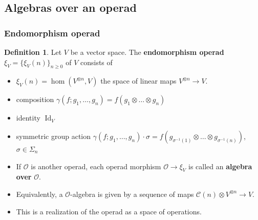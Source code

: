 \documentclass{beamer}
\theoremstyle{definition}
\newtheorem{defi}{Definition}
\newcommand{\CC}{\mathcal{C}}
\begin{document}
\subsection{Algebras over an operad}
\begin{frame}
	\frametitle{Endomorphism operad}
	\begin{defi}
		Let $V$ be a vector space. The \textbf{endomorphism operad} $\xi_V = \{ \xi_V(n) \}_{n\geq 0}$ of $V$ consists of
		\begin{itemize}
			\item<1-> $\xi_V(n)=\hom(V^{\otimes n},V)
			$ the space of linear maps $V^{\otimes n} \to V$.
			\item<2-> composition $\gamma(f; g_1, \dots, g_n)= f(g_1\otimes\dots\otimes g_n)$
			\item<3-> identity $\operatorname{Id}_V$
			\item<4->  symmetric group action $\gamma (f; g_1, \dots, g_n) \cdot \sigma = f (g_{\sigma^{-1}(1)} \otimes \dots \otimes g_{\sigma^{-1}(n)})$,  $\sigma \in \Sigma_n$
		\end{itemize}
	\end{defi}
\end{frame}
\begin{frame}
\begin{itemize}
\item<1->
If $\mathcal{O}$ is another operad, each operad morphism $\mathcal{O} \to \xi_V$ is called an \textbf{algebra over} $\mathcal{O}$. 
\item<2->Equivalently, a $\mathcal{O}$-algebra is given by a sequence of maps $\CC(n)\otimes V^{\otimes n}\to V$.
\item<3-> This is a realization of the operad as a space of operations.
\end{itemize}
\end{frame}
\end{document}
